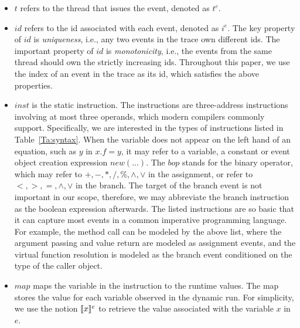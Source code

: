 \begin{itemize}
\item $t$ refers to the thread that issues the event, denoted as $t^e$.
\item  $id$ refers to the id associated with each event, denoted as $i^e$. The key property of  $id$ is {\em uniqueness}, i.e., any two events in the trace own different ids. The important property of $id$ is {\em monotonicity}, i.e.,  the events from the same thread should own the strictly increasing ids. Throughout this paper, we use  the index of an event in the trace as its id, which satisfies the above properties. 
\item $inst$ is the static instruction. The instructions are three-address instructions involving at most three operands, which modern compilers commonly support.  Specifically, we are interested in the types of instructions listed in Table~\ref{Ta:syntax}. When the variable does not appear on the left hand of an equation, such as $y$ in $x.f=y$, it may refer to a variable, a constant or event object creation expression $new (...)$.  The $bop$ stands for the binary operator, which may refer to $+, -, *, /, \%, \wedge, \vee$ in the assignment, or refer to $<, >, =, \wedge, \vee$ in the branch. The target of the branch event is not important in our scope, therefore, we may abbreviate the branch instruction as the boolean expression afterwards. The listed instructions are so basic that it can capture most events in a common imperative programming language. For example, the method call can be modeled by the above list, where the argument passing and value return are modeled as assignment events, and the virtual function resolution is modeled as the branch event conditioned on the type of the caller object.
\item $map$ maps the variable in the instruction to the runtime values. The map stores the value for each variable observed in the dynamic run. For simplicity, we use the notion $\lbrack\!\lbrack x \rbrack\!\rbrack^e$ to retrieve the value associated with the variable $x$ in $e$. 
\end{itemize}


